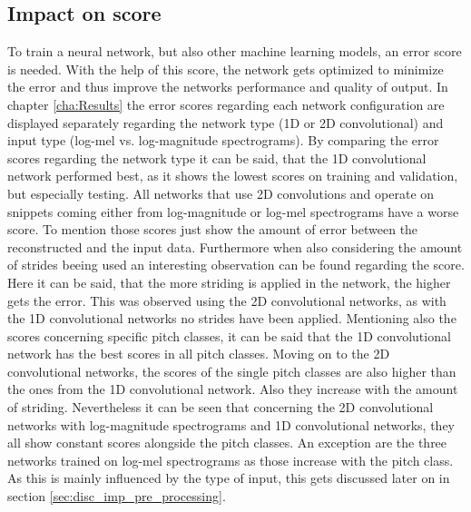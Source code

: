 \subsection{Impact on score}
\label{subsec:disc_conf_score}
To train a neural network, but also other machine learning models, an error score is needed. With the help of this score, the network gets optimized to minimize the error and thus improve the networks performance and quality of output. In chapter \ref{cha:Results} the error scores regarding each network configuration are displayed separately regarding the network type (1D or 2D convolutional) and input type (log-mel vs. log-magnitude spectrograms). By comparing the error scores regarding the network type it can be said, that the 1D convolutional network performed best, as it shows the lowest scores on training and validation, but especially testing. All networks that use 2D convolutions and operate on snippets coming either from log-magnitude or log-mel spectrograms have a worse score. To mention those scores just show the amount of error between the reconstructed and the input data. Furthermore when also considering the amount of strides beeing used an interesting observation can be found regarding the score. Here it can be said, that the more striding is applied in the network, the higher gets the error. This was observed using the 2D convolutional networks, as with the 1D convolutional networks no strides have been applied. Mentioning also the scores concerning specific pitch classes, it can be said that the 1D convolutional network has the best scores in all pitch classes. Moving on to the 2D convolutional networks, the scores of the single pitch classes are also higher than the ones from the 1D convolutional network. Also they increase with the amount of striding. Nevertheless it can be seen that concerning the 2D convolutional networks with log-magnitude spectrograms and 1D convolutional networks, they all show constant scores alongside the pitch classes. An exception are the three networks trained on log-mel spectrograms as those increase with the pitch class. As this is mainly influenced by the type of input, this gets discussed later on in section \ref{sec:disc_imp_pre_processing}. 

